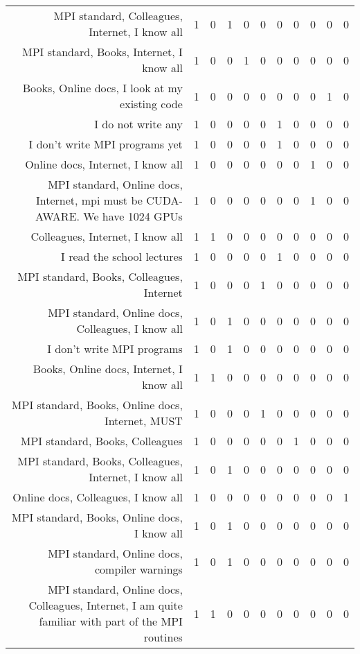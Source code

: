 {\begin{landscape}
\begin{longtable}[htb]{r|c|c|c|c|c|c|c|c|c|c}
{MPI standard, Colleagues, Internet, I know all} & 1 & 0 & 1 & 0 & 0 & 0 & 0 & 0 & 0 & 0 \\%
{MPI standard, Books, Internet, I know all} & 1 & 0 & 0 & 1 & 0 & 0 & 0 & 0 & 0 & 0 \\%
{Books, Online docs, I look at my existing code} & 1 & 0 & 0 & 0 & 0 & 0 & 0 & 0 & 1 & 0 \\%
{I do not write any} & 1 & 0 & 0 & 0 & 0 & 1 & 0 & 0 & 0 & 0 \\%
{I don't write MPI programs yet} & 1 & 0 & 0 & 0 & 0 & 1 & 0 & 0 & 0 & 0 \\%
{Online docs, Internet, I know all} & 1 & 0 & 0 & 0 & 0 & 0 & 0 & 1 & 0 & 0 \\%
{MPI standard, Online docs, Internet, mpi must be CUDA-AWARE. We have 1024 GPUs} & 1 & 0 & 0 & 0 & 0 & 0 & 0 & 1 & 0 & 0 \\%
{Colleagues, Internet, I know all} & 1 & 1 & 0 & 0 & 0 & 0 & 0 & 0 & 0 & 0 \\%
{I read the school lectures} & 1 & 0 & 0 & 0 & 0 & 1 & 0 & 0 & 0 & 0 \\%
{MPI standard, Books, Colleagues, Internet} & 1 & 0 & 0 & 0 & 1 & 0 & 0 & 0 & 0 & 0 \\%
{MPI standard, Online docs, Colleagues, I know all} & 1 & 0 & 1 & 0 & 0 & 0 & 0 & 0 & 0 & 0 \\%
{I don't write MPI programs} & 1 & 0 & 1 & 0 & 0 & 0 & 0 & 0 & 0 & 0 \\%
{Books, Online docs, Internet, I know all} & 1 & 1 & 0 & 0 & 0 & 0 & 0 & 0 & 0 & 0 \\%
{MPI standard, Books, Online docs, Internet, MUST} & 1 & 0 & 0 & 0 & 1 & 0 & 0 & 0 & 0 & 0 \\%
{MPI standard, Books, Colleagues} & 1 & 0 & 0 & 0 & 0 & 0 & 1 & 0 & 0 & 0 \\%
{MPI standard, Books, Colleagues, Internet, I know all} & 1 & 0 & 1 & 0 & 0 & 0 & 0 & 0 & 0 & 0 \\%
{Online docs, Colleagues, I know all} & 1 & 0 & 0 & 0 & 0 & 0 & 0 & 0 & 0 & 1 \\%
{MPI standard, Books, Online docs, I know all} & 1 & 0 & 1 & 0 & 0 & 0 & 0 & 0 & 0 & 0 \\%
{MPI standard, Online docs, compiler warnings} & 1 & 0 & 1 & 0 & 0 & 0 & 0 & 0 & 0 & 0 \\%
{MPI standard, Online docs, Colleagues, Internet, I am quite familiar with part of the MPI routines} & 1 & 1 & 0 & 0 & 0 & 0 & 0 & 0 & 0 & 0 \\%
\hline%
\end{longtable}%
\end{landscape}}%
\clearpage%
